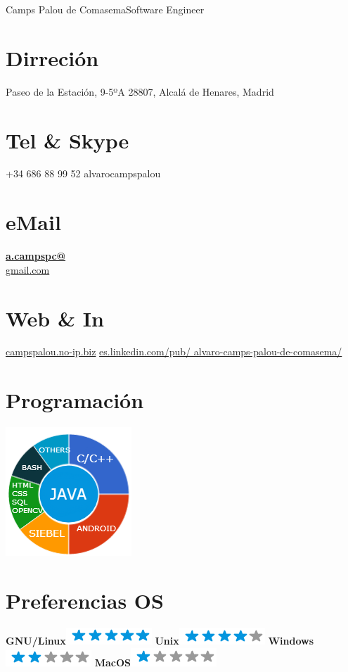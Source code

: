 \documentclass[]{friggeri-cv}
\begin{document}
 {Camps} {Palou de Comasema}{Software Engineer}

      

\begin{aside}
  \section{Dirreción}
    Paseo de la Estación, 9-5ºA
    28807, Alcalá de Henares, Madrid
    ~
  \section{Tel \& Skype}
    +34 686 88 99 52
    alvarocampspalou
    ~
  \section{eMail}
    \href{mailto:a.campspc@gmail.com}{\textbf{a.campspc@}\\gmail.com}
    ~
  \section{Web \& In}
    \href{http://campspalou.no-ip.biz}{campspalou.no-ip.biz}
    \href{https://es.linkedin.com/pub/alvaro-camps-palou-de-comasema/}{es.linkedin.com/pub/ alvaro-camps-palou-de-comasema/}
    ~
  \section{Programación}
    \includegraphics[scale=0.62]{img/programming.png}
    ~
  \section{Preferencias OS}
    \textbf{GNU/Linux}\includegraphics[scale=0.40]{img/5stars.png}
    \textbf{Unix}\includegraphics[scale=0.40]{img/4stars.png}
    \textbf{Windows}\includegraphics[scale=0.40]{img/2stars.png}
    \textbf{MacOS}\includegraphics[scale=0.40]{img/1stars.png}
    ~

\end{aside}
\end{document}
